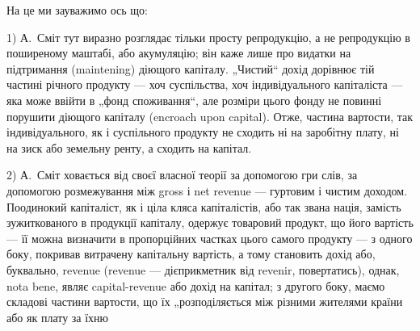 На це ми зауважимо ось що:

1) А.~Сміт тут виразно розглядає тільки просту репродукцію, а не
репродукцію в поширеному маштабі, або акумуляцію; він каже лише про
видатки на підтримання (maintening) діющого капіталу. „Чистий“ дохід
дорівнює тій частині річного продукту — хоч суспільства, хоч індивідуального
капіталіста — яка може ввійти в „фонд споживання“, але розміри
цього фонду не повинні порушити діющого капіталу (encroach upon capital).
Отже, частина вартости, так індивідуального, як і суспільного продукту
не сходить ні на заробітну плату, ні на зиск або земельну ренту,
а сходить на капітал.

2) А.~Сміт ховається від своєї власної теорії за допомогою гри слів,
за допомогою розмежування між gross і net revenue — гуртовим і чистим
доходом. Поодинокий капіталіст, як і ціла кляса капіталістів, або так
звана нація, замість зужиткованого в продукції капіталу, одержує товаровий
продукт, що його вартість — її можна визначити в пропорційних частках
цього самого продукту — з одного боку, покривав витрачену капітальну
вартість, а тому становить дохід або, буквально, revenue (revenue — дієприкметник
від revenir, повертатись), однак, nota bene, являє capital-revenue або
дохід на капітал; з другого боку, маємо складові частини вартости, що
їх „розподіляється між різними жителями країни або як плату за їхню
\parbreak{}  %
